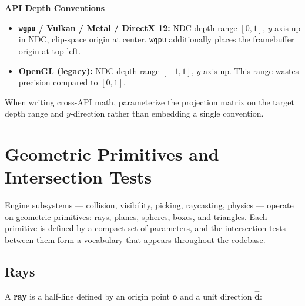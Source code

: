\documentclass[
  11pt,
  letterpaper,
  DIV=11,
  numbers=noendperiod,
  twoside,
  open=right]{scrreprt}
\providecommand{\tightlist}{%
  \setlength{\itemsep}{0pt}\setlength{\parskip}{0pt}}
\begin{document}
\begin{tcolorbox}[enhanced jigsaw, arc=.35mm, bottomrule=.15mm, breakable, colback=white, colframe=quarto-callout-note-color-frame, left=2mm, leftrule=.75mm, opacityback=0, rightrule=.15mm, toprule=.15mm]
\begin{minipage}[t]{5.5mm}
\textcolor{quarto-callout-note-color}{\faInfo}
\end{minipage}%
\begin{minipage}[t]{\textwidth - 5.5mm}

\vspace{-3mm}\textbf{API Depth Conventions}\vspace{3mm}

\begin{itemize}
\tightlist
\item
  \textbf{\texttt{wgpu} / Vulkan / Metal / DirectX 12:} NDC depth range
  \([0, 1]\), \(y\)-axis up in NDC, clip-space origin at center.
  \texttt{wgpu} additionally places the framebuffer origin at top-left.
\item
  \textbf{OpenGL (legacy):} NDC depth range \([-1, 1]\), \(y\)-axis up.
  This range wastes precision compared to \([0, 1]\).
\end{itemize}

When writing cross-API math, parameterize the projection matrix on the
target depth range and \(y\)-direction rather than embedding a single
convention.

\end{minipage}%
\end{tcolorbox}

\section{Geometric Primitives and Intersection
Tests}\label{geometric-primitives-and-intersection-tests}

Engine subsystems --- collision, visibility, picking, raycasting,
physics --- operate on geometric primitives: rays, planes, spheres,
boxes, and triangles. Each primitive is defined by a compact set of
parameters, and the intersection tests between them form a vocabulary
that appears throughout the codebase.

\subsection{Rays}\label{rays}

A \textbf{ray} is a half-line defined by an origin point \(\mathbf{o}\)
and a unit direction \(\hat{\mathbf{d}}\):
\end{document}
